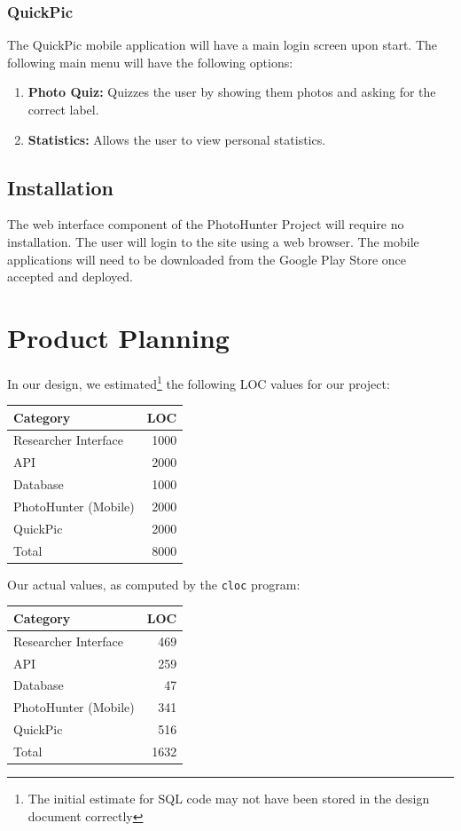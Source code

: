 \documentclass{article}
\begin{document}
\subsubsection{QuickPic}
The QuickPic mobile application will have a main login screen upon start. The
following main menu will have the following options:

\begin{enumerate}

  \item \textbf {Photo Quiz:} Quizzes the user by showing them photos and
        asking for the correct label.

  \item \textbf{Statistics:} Allows the user to view personal statistics.

\end{enumerate}

\subsection{Installation}
The web interface component of the PhotoHunter Project will require no
installation. The user will login to the site using a web browser. The mobile
applications will need to be downloaded from the Google Play Store once
accepted and deployed.



\section{Product Planning}
In our design, we estimated\footnote{The initial estimate for SQL code may not
  have been stored in the design document correctly} the following LOC values
for our project:

\begin{center}
\begin{tabular}{l|r}
  Category & LOC \\
  \hline
  Researcher Interface & 1000 \\
  API & 2000 \\
  Database & 1000 \\
  PhotoHunter (Mobile) & 2000 \\
  QuickPic & 2000 \\
  \hline
  Total & 8000
\end{tabular}
\end{center}

Our actual values, as computed by the \texttt{cloc} program:

\begin{center}
  \begin{tabular}{l|r}
    Category & LOC \\
    \hline
    Researcher Interface & 469 \\
    API & 259 \\
    Database & 47 \\
    PhotoHunter (Mobile) & 341 \\
    QuickPic & 516 \\
    \hline
    Total & 1632
  \end{tabular}
\end{center}
\end{document}
